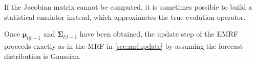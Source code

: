 \documentclass[12pt,letterpaper]{article}
\theoremstyle{propstyle}
\theoremstyle{propstyle}
\newcommand{\bfmu}{\bm{\mu}}
\newcommand{\bfSigma}{\bm{\Sigma}}
\begin{document}
If the Jacobian matrix cannot be computed, it is sometimes possible to build a statistical emulator \citep[e.g.][]{Kaufman2011} instead, which approximates the true evolution operator.

Once $\bfmu_{t|t-1}$ and $\bfSigma_{t|t-1}$ have been obtained, the update step of the EMRF proceeds exactly as in the MRF in \ref{sec:mrfupdate} by assuming the forecast distribution is Gaussian.





\footnotesize


\end{document}
